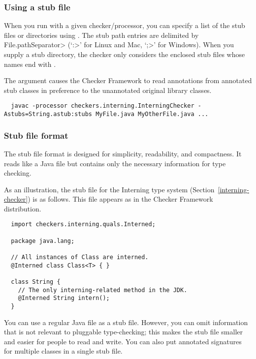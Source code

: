 \subsubsection{Using a stub file\label{stub-using}}

  When you run  with a given checker/processor, you can specify
  a list of the stub files or directories using
  .  The stub path entries
  are delimited by
  \<File.pathSeparator> (`\<:>' for Linux and Mac, `\<;>' for Windows).
  When you supply a stub directory, the checker only considers the enclosed
  stub files whose names end with .

  The  argument causes the Checker Framework to read annotations
  from annotated stub classes in preference to the unannotated original
  library classes.

\begin{smaller}
\begin{Verbatim}
  javac -processor checkers.interning.InterningChecker -Astubs=String.astub:stubs MyFile.java MyOtherFile.java ...
\end{Verbatim}
\end{smaller}


\subsubsection{Stub file format\label{stub-format}}

The stub file format is designed for simplicity, readability, and
compactness.  It reads like a Java file but contains only the
necessary information for type checking.

As an illustration, the stub file for the Interning type system
(Section~\ref{interning-checker}) is as follows.  This file appears as
 in the Checker Framework
distribution.

\begin{Verbatim}
  import checkers.interning.quals.Interned;

  package java.lang;

  // All instances of Class are interned.
  @Interned class Class<T> { }

  class String {
    // The only interning-related method in the JDK.
    @Interned String intern();
  }
\end{Verbatim}


You can use a regular Java file as a stub file.  However, you can omit
information that is not relevant to pluggable type-checking; this makes the
stub file smaller and easier for people to read and write.  You can also
put annotated signatures for multiple classes in a single stub file.


